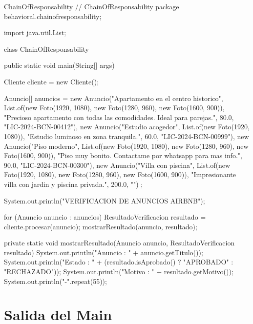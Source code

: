 \begin{codigof}{ChainOfResponsability}
// ChainOfResponsability
package behavioral.chainofresponsability;

import java.util.List;

class ChainOfResponsability {
    public static void main(String[] args) {
        Cliente cliente = new Cliente();

        Anuncio[] anuncios = {
                new Anuncio("Apartamento en el centro historico",
                        List.of(new Foto(1920, 1080), new Foto(1280, 960), new Foto(1600, 900)),
                        "Precioso apartamento con todas las comodidades. Ideal para parejas.",
                        80.0, "LIC-2024-BCN-00412"),
                new Anuncio("Estudio acogedor",
                        List.of(new Foto(1920, 1080)),
                        "Estudio luminoso en zona tranquila.",
                        60.0, "LIC-2024-BCN-00999"),
                new Anuncio("Piso moderno",
                        List.of(new Foto(1920, 1080), new Foto(1280, 960), new Foto(1600, 900)),
                        "Piso muy bonito. Contactame por whatsapp para mas info.",
                        90.0, "LIC-2024-BCN-00300"),
                new Anuncio("Villa con piscina",
                        List.of(new Foto(1920, 1080), new Foto(1280, 960), new Foto(1600, 900)),
                        "Impresionante villa con jardin y piscina privada.",
                        200.0, "")
        };

        System.out.println("VERIFICACION DE ANUNCIOS AIRBNB\n");

        for (Anuncio anuncio : anuncios) {
            ResultadoVerificacion resultado = cliente.procesar(anuncio);
            mostrarResultado(anuncio, resultado);
        }
    }

    private static void mostrarResultado(Anuncio anuncio, ResultadoVerificacion resultado) {
        System.out.println("Anuncio : " + anuncio.getTitulo());
        System.out.println("Estado  : " + (resultado.isAprobado() ? "APROBADO" : "RECHAZADO"));
        System.out.println("Motivo  : " + resultado.getMotivo());
        System.out.println("-".repeat(55));
    }
}
\end{codigof}


\section{Salida del Main}

